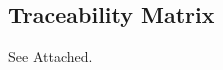 \documentclass [landscape, 8pt] {article}
\newcommand {\tab} {\hspace*{2em}}
\begin{document}
	\subsection {Traceability Matrix}
		\tab See Attached. %
	
\end{document}
